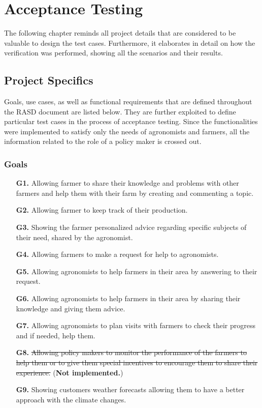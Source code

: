 \chapter{Acceptance Testing} \label{ch:acceptance_testing}

The following chapter reminds all project details that are considered to be valuable to design the test cases. Furthermore, it elaborates in detail on how the verification was performed, showing all the scenarios and their results.

\section{Project Specifics}

Goals, use cases, as well as functional requirements that are defined throughout the RASD document are listed below. They are further exploited to define particular test cases in the process of acceptance testing. Since the functionalities were implemented to satisfy only the needs of agronomists and farmers, all the information related to the role of a policy maker is crossed out.

\subsection{Goals}

\begin{enumerate}
	\item [\textbf{G1.}] Allowing farmer to share their knowledge and problems with other farmers and help them with their farm by creating and commenting a topic.
	\item [\textbf{G2.}] Allowing farmer to keep track of their production.
	\item [\textbf{G3.}] Showing the farmer personalized advice regarding specific subjects of their need, shared by the agronomist.
	\item [\textbf{G4.}] Allowing farmers to make a request for help to agronomists.
	\item [\textbf{G5.}] Allowing agronomists to help farmers in their area by answering to their request.
	\item [\textbf{G6.}] Allowing agronomists to help farmers in their area by sharing their knowledge and giving them advice.
	\item [\textbf{G7.}] Allowing agronomists to plan visits with farmers to check their progress and if needed, help them.
	\item [\textbf{G8.}] \sout{Allowing policy makers to monitor the performance of the farmers to help them or to give them special incentives to encourage them to share their experience.} (\textbf{Not implemented.})
	\item [\textbf{G9.}] Showing customers weather forecasts allowing them to have a better approach with the climate changes.
\end{enumerate}

